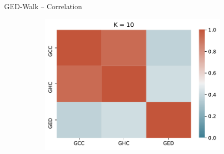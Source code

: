 \documentclass[10pt,titlepage,english,presentation]{beamer}
\begin{document}
\begin{frame}[t]{GED-Walk -- Correlation}
\begin{figure}
\begin{subfigure}[t]{.33\textwidth}
\includegraphics[width=.9\textwidth]{./images/ged-corrs-k10.pdf}
\end{subfigure}\medskip


\end{figure}
\end{frame}
\end{document}
